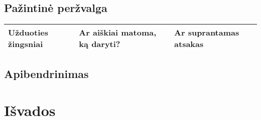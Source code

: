 \documentclass[oneside]{VUMIFPSkursinis}
\begin{document}
	\subsection{Pažintinė peržvalga}
\begin{center}
    \begin{tabular}{ |p{4cm}| p{6cm} | p{7cm} | }
    \hline
    Užduoties žingsniai & Ar aiškiai matoma, ką daryti? & Ar suprantamas atsakas \\ \hline 
   \hline
    \end{tabular}
\end{center}
	\subsection{Apibendrinimas}
\iffalse XXXXXXXXXXXXXXXXXXXXXXXXXXXXXXXXXXXXXXXXXXXXXXXXXXXXXXXXXXXXXXXXXXXXXXXXXXXXXXXXXXXXXXXXXXXXXXXXXXXXXXXXXXXXXXXXXXXXXXXXXXXXXXXXXXXXXXX \fi
\section{Išvados}
\end{document}
